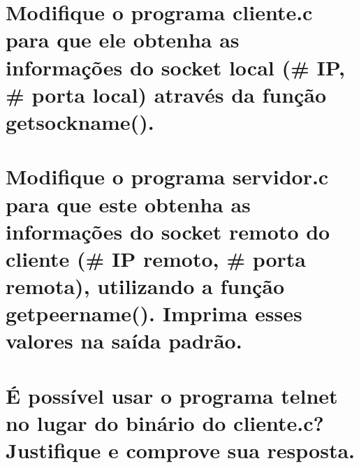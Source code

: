 \documentclass[12pt,a4paper]{report}
\begin{document}
\section{Modifique o programa cliente.c para que ele obtenha as informações do socket local (\# IP, \#
porta local) através da função getsockname().}

\section{Modifique o programa servidor.c para que este obtenha as informações do socket remoto do
cliente (\# IP remoto, \# porta remota), utilizando a função getpeername(). Imprima esses
valores na saída padrão.}

\section{É possível usar o programa telnet no lugar do binário do cliente.c? Justifique e comprove sua
resposta.}
\end{document}
